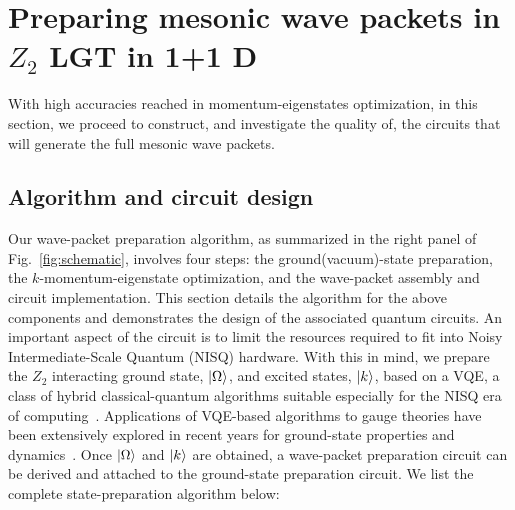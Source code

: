 \documentclass[a4paper,onecolumn,11pt,accepted=2024-10-11]{quantumarticle}
\begin{document}

\section{Preparing mesonic wave packets in $Z_2$ LGT in 1+1 D
\label{sec:3}
}
\noindent
With high accuracies reached in momentum-eigenstates optimization, in this section, we proceed to construct, and investigate the quality of, the circuits that will generate the full mesonic wave packets.

\subsection{
Algorithm and circuit design
\label{sec:3-1}}
Our wave-packet preparation algorithm, as summarized in the right panel of Fig.~\ref{fig:schematic}, involves four steps: the ground(vacuum)-state preparation, the $k$-momentum-eigenstate optimization, and the wave-packet assembly and circuit implementation. This section details the algorithm for the above components and demonstrates the design of the associated quantum circuits. An important aspect of the circuit is to limit the resources required to fit into Noisy Intermediate-Scale Quantum (NISQ) hardware. With this in mind, we prepare the $Z_2$ interacting ground state, $\ket{\Omega}$, and excited states, $\ket{k}$, based on a VQE, a class of hybrid classical-quantum algorithms suitable especially for the NISQ era of computing~\cite{Peruzzo:2013bzg, McClean:2015vup,Tilly:2021jem}. Applications of VQE-based algorithms to gauge theories have been extensively explored in recent years for ground-state properties and dynamics~\cite{Kokail:2018eiw, Lumia:2021tpu, Farrell:2023fgd, Paulson:2020zjd, Atas:2021ext,Popov:2023xft,Liu:2021otn,Nagano:2023uaq,Xie:2022jgj}. Once $\ket{\Omega}$ and $\ket{k}$ are obtained, a wave-packet preparation circuit can be derived and attached to the ground-state preparation circuit. We list the complete state-preparation algorithm below:
%
\sloppy
\end{document}
